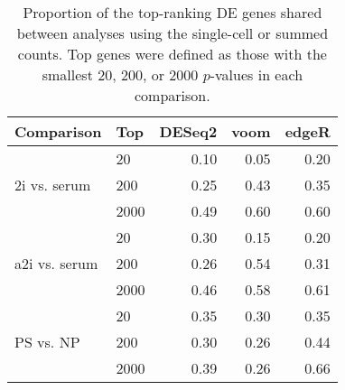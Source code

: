 \documentclass[oupdraft]{bio}
\begin{document}
\begin{table}[!p]
\caption{Proportion of the top-ranking DE genes shared between analyses using the single-cell or summed counts.
Top genes were defined as those with the smallest 20, 200, or 2000 $p$-values in each comparison.
}
\label{tab:realrank}
\begin{center}
\begin{tabular}{l l r r r}
\hline
\textbf{Comparison} & \textbf{Top} & \textbf{DESeq2} & \textbf{voom} & \textbf{edgeR} \\
\hline
\multirow{3}{*}{2i vs. serum} 
& 20 & 0.10 & 0.05 & 0.20 \\
& 200 & 0.25 & 0.43 & 0.35 \\
& 2000 & 0.49 & 0.60 & 0.60 \\
\hline
\multirow{3}{*}{a2i vs. serum} 
& 20 & 0.30 & 0.15 & 0.20 \\
& 200 & 0.26 & 0.54 & 0.31 \\
& 2000 & 0.46 & 0.58 & 0.61 \\
\hline
\multirow{3}{*}{PS vs. NP} 
& 20 & 0.35 & 0.30 & 0.35 \\
& 200 & 0.30 & 0.26 & 0.44 \\
& 2000 & 0.39 & 0.26 & 0.66 \\
\hline
\end{tabular}
\end{center}
\end{table}
\end{document}
